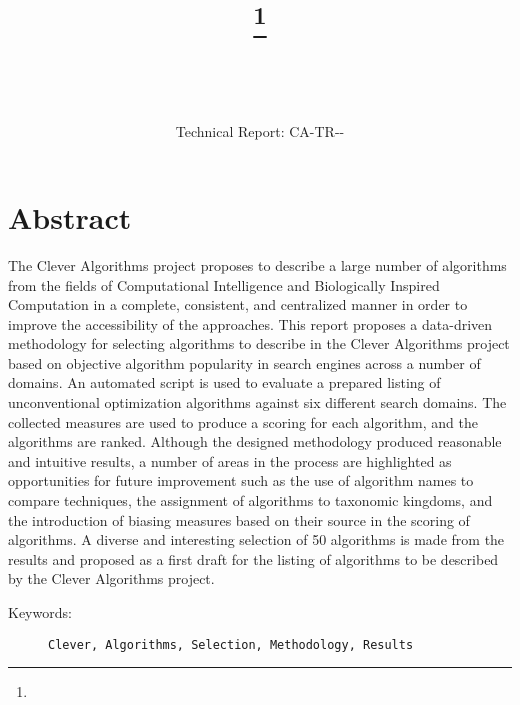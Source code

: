 \documentclass[a4paper, 11pt]{article}
\title{{\myreporttitle}\footnote{\myreportlicense}}
\author{\myreportauthor\\{\myreportemail}\\\small\myreportproject}
\date{\myreportfulldate\\{\small{Technical Report: CA-TR-{\myreportdate}-\myreportversion}}}
\begin{document}
\maketitle

\section*{Abstract} 
The Clever Algorithms project proposes to describe a large number of algorithms from the fields of Computational Intelligence and Biologically Inspired Computation in a complete, consistent, and centralized manner in order to improve the accessibility of the approaches.
This report proposes a data-driven methodology for selecting algorithms to describe in the Clever Algorithms project based on objective algorithm popularity in search engines across a number of domains. 
An automated script is used to evaluate a prepared listing of unconventional optimization algorithms against six different search domains. The collected measures are used to produce a scoring for each algorithm, and the algorithms are ranked.
Although the designed methodology produced reasonable and intuitive results, a number of areas in the process are highlighted as opportunities for future improvement such as the use of algorithm names to compare techniques, the assignment of algorithms to taxonomic kingdoms, and the introduction of biasing measures based on their source in the scoring of algorithms.
A diverse and interesting selection of 50 algorithms is made from the results and proposed as a first draft for the listing of algorithms to be described by the Clever Algorithms project. 

\begin{description}
	\item[Keywords:] {\small\texttt{Clever, Algorithms, Selection, Methodology, Results}}
\end{description} 

\end{document}
